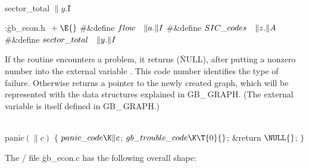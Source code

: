 \Y\B\4\D\\{sector\_total}\5
$\|y.{}$\|I\par
\Y\B\4:\.{gb\_econ.h }\X${}\mathrel+\E{}$\6
\8\#\&{define} ${}\\{flow}\hbox{\quad}\|a.\|I{}$\6
\8\#\&{define} ${}\\{SIC\_codes}\hbox{\quad}\|z.\|A{}$\6
\8\#\&{define} ${}\\{sector\_total}\hbox{\quad}\|y.\|I{}$\par
\fi

If the  routine encounters a problem, it returns \PB{$\NULL$}
(\.{NULL}), after putting a nonzero number into the external variable
. This code number identifies the type of failure.
Otherwise  returns a pointer to the newly created graph, which
will be represented with the data structures explained in {\sc GB\_\,GRAPH}.
(The external variable  is itself defined in
{\sc GB\_\,GRAPH}.)

\Y\B\4\D\\{panic}$(\|c)$\5
${}\{{}$\5
\1${}\\{panic\_code}\K\|c{}$;\5
${}\\{gb\_trouble\_code}\K\T{0}{}$;\5
\&{return} ${}\NULL{}$;\5
${}\}{}$\2\par
\fi

The \CEE/ file \.{gb\_econ.c} has the following overall shape:

